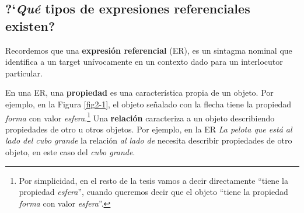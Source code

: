 

\subsection{?`\emph{Qu\'e} tipos de expresiones referenciales existen?}
\label{sec:tipos_er}

Recordemos que una {\bf expresi\'on referencial} (ER), es un sintagma nominal que identifica a un target un\'ivocamente en un contexto dado para un interlocutor particular.

En una ER, una \textbf{propiedad} es una caracter\'istica propia de un objeto. Por ejemplo, en la Figura \ref{fig2-1}, el objeto se\~nalado con la flecha tiene la propiedad {\it forma} con valor {\it esfera}.\footnote{Por simplicidad, en el resto de la tesis vamos a decir directamente ``tiene la propiedad {\it esfera}'', cuando queremos decir que el objeto ``tiene la propiedad \emph{forma} con valor \emph{esfera}''.} Una \textbf{relaci\'on} caracteriza a un objeto describiendo propiedades de otro u otros objetos. Por ejemplo, en la ER {\it La pelota que est\'a al lado del cubo grande} la relaci\'on \emph{al lado de} necesita describir propiedades de otro objeto, en este caso del {\it cubo grande}.


